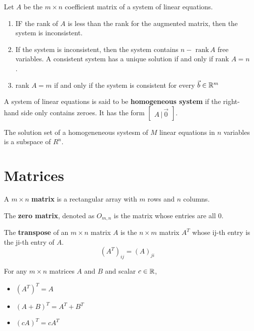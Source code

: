 \documentclass[english, 12pt]{article}
\begin{document}
\begin{thrm}
Let $A$ be the $m \times n$ coefficient matrix of a system of linear equations.
\begin{enumerate}
\item IF the rank of $A$ is less than the rank for the augmented matrix, then the system is inconsistent.
\item If the system is inconsistent, then the system contains $n - \text{ rank}\,A$ free variables. A consistent system has a unique solution if and only if rank $A=n$.
\item rank $A=m$ if and only if the system is consistent for every $\vec{b} \in {\mathbb{R}}^m$
\end{enumerate}
\end{thrm}

\begin{defn}
A system of linear equations is said to be \textbf{homogeneous system} if the right-hand side only contains zeroes. It has the form $\begin{bmatrix} A\, |\, \vec{0} \end{bmatrix}$.
\end{defn}

\begin{thrm}
The solution set of a homogeneneous systesm of $M$ linear equations in $n$ variables is a subspace of $R^n$.
\end{thrm}

\section{Matrices}
\begin{defn}
A $m \times n$ \textbf{matrix} is a rectangular array with $m$ rows and $n$ columns.
\end{defn}

\begin{defn}
The \textbf{zero matrix}, denoted as $O_{m,n}$ is the matrix whose entries are all $0$.
\end{defn}

\begin{defn}
The \textbf{transpose} of an $m \times n$ matrix $A$ is the $n \times m$ matrix $A^T$ whose ij-th entry is the ji-th entry of $A$.
\[ (A^T)_{ij} = (A)_{ji}\]
\end{defn}

\begin{thrm}
For any $m \times n$ matrices $A$ and $B$ and scalar $c \in {\mathbb{R}}$, 
\begin{itemize}
\item $(A^T)^T = A$
\item $(A+B)^T = A^T + B^T$
\item $(cA)^T = cA^T$
\end{itemize}
\end{thrm}
\end{document}
